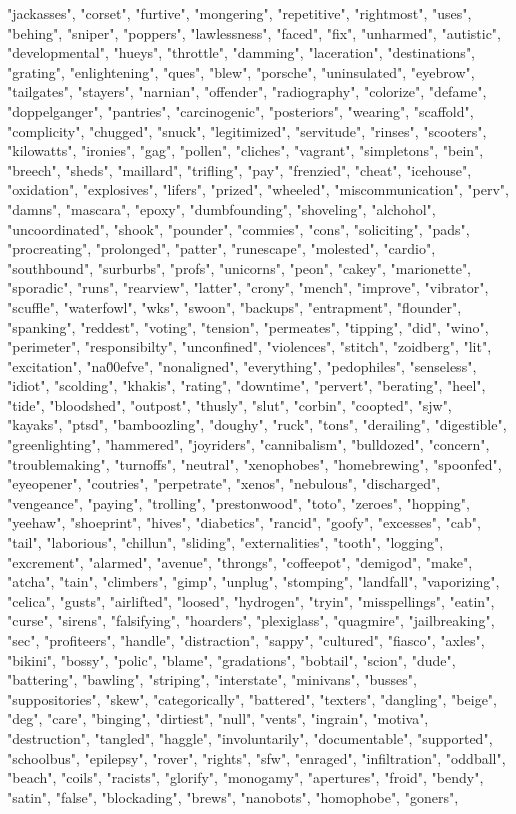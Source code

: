"jackasses", "corset", "furtive", "mongering", "repetitive", "rightmost", "uses", "behing", "sniper", "poppers", "lawlessness", "faced", "fix", "unharmed", "autistic", "developmental", "hueys", "throttle", "damming", "laceration", "destinations", "grating", "enlightening", "ques", "blew", "porsche", "uninsulated", "eyebrow", "tailgates", "stayers", "narnian", "offender", "radiography", "colorize", "defame", "doppelganger", "pantries", "carcinogenic", "posteriors", "wearing", "scaffold", "complicity", "chugged", "snuck", "legitimized", "servitude", "rinses", "scooters", "kilowatts", "ironies", "gag", "pollen", "cliches", "vagrant", "simpletons", "bein", "breech", "sheds", "maillard", "trifling", "pay", "frenzied", "cheat", "icehouse", "oxidation", "explosives", "lifers", "prized", "wheeled", "miscommunication", "perv", "damns", "mascara", "epoxy", "dumbfounding", "shoveling", "alchohol", "uncoordinated", "shook", "pounder", "commies", "cons", "soliciting", "pads", "procreating", "prolonged", "patter", "runescape", "molested", "cardio", "southbound", "surburbs", "profs", "unicorns", "peon", "cakey", "marionette", "sporadic", "runs", "rearview", "latter", "crony", "mench", "improve", "vibrator", "scuffle", "waterfowl", "wks", "swoon", "backups", "entrapment", "flounder", "spanking", "reddest", "voting", "tension", "permeates", "tipping", "did", "wino", "perimeter", "responsibilty", "unconfined", "violences", "stitch", "zoidberg", "lit", "excitation", "na\u00efve", "nonaligned", "everything", "pedophiles", "senseless", "idiot", "scolding", "khakis", "rating", "downtime", "pervert", "berating", "heel", "tide", "bloodshed", "outpost", "thusly", "slut", "corbin", "coopted", "sjw", "kayaks", "ptsd", "bamboozling", "doughy", "ruck", "tons", "derailing", "digestible", "greenlighting", "hammered", "joyriders", "cannibalism", "bulldozed", "concern", "troublemaking", "turnoffs", "neutral", "xenophobes", "homebrewing", "spoonfed", "eyeopener", "coutries", "perpetrate", "xenos", "nebulous", "discharged", "vengeance", "paying", "trolling", "prestonwood", "toto", "zeroes", "hopping", "yeehaw", "shoeprint", "hives", "diabetics", "rancid", "goofy", "excesses", "cab", "tail", "laborious", "chillun", "sliding", "externalities", "tooth", "logging", "excrement", "alarmed", "avenue", "throngs", "coffeepot", "demigod", "make", "atcha", "tain", "climbers", "gimp", "unplug", "stomping", "landfall", "vaporizing", "celica", "gusts", "airlifted", "loosed", "hydrogen", "tryin", "misspellings", "eatin", "curse", "sirens", "falsifying", "hoarders", "plexiglass", "quagmire", "jailbreaking", "sec", "profiteers", "handle", "distraction", "sappy", "cultured", "fiasco", "axles", "bikini", "bossy", "polic", "blame", "gradations", "bobtail", "scion", "dude", "battering", "bawling", "striping", "interstate", "minivans", "busses", "suppositories", "skew", "categorically", "battered", "texters", "dangling", "beige", "deg", "care", "binging", "dirtiest", "null", "vents", "ingrain", "motiva", "destruction", "tangled", "haggle", "involuntarily", "documentable", "supported", "schoolbus", "epilepsy", "rover", "rights", "sfw", "enraged", "infiltration", "oddball", "beach", "coils", "racists", "glorify", "monogamy", "apertures", "froid", "bendy", "satin", "false", "blockading", "brews", "nanobots", "homophobe", "goners", 